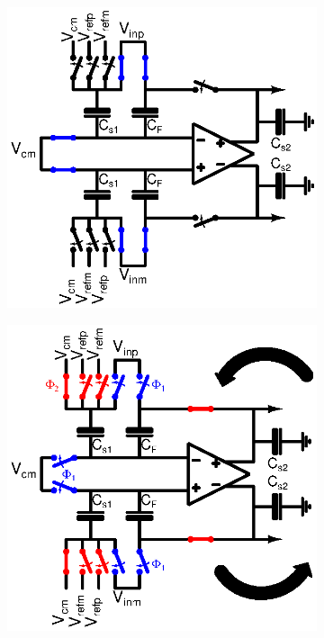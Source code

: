 \begin{figure}[htp]
	\centering
	\begin{subfigure}[b]{0.32\textwidth}
		\centering
		\includegraphics[width=\textwidth]{Chapter4/Figs/algorithmic-mdac-p1.ps}
		\label{fig:algo-p1}
	\end{subfigure}
	\begin{subfigure}[b]{0.32\textwidth}
		\centering
		\includegraphics[width=\textwidth]{Chapter4/Figs/algorithmic-mdac-p2.ps}

\end{subfigure}
\end{figure}
